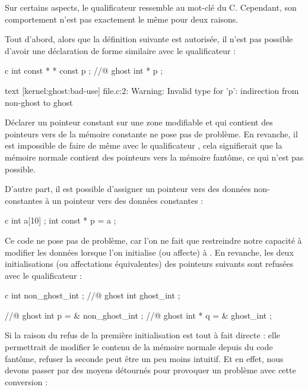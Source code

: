

Sur certains aspects, le qualificateur  ressemble
au mot-clé  du C. Cependant, son comportement n'est pas
exactement le même pour deux raisons.


Tout d'abord, alors que la définition  suivante
est autorisée,  il n'est pas possible d'avoir une déclaration de
forme similaire avec le qualificateur  :


\begin{CodeBlock}{c}
int const * * const p ;
//@ ghost int \ghost * * p ;
\end{CodeBlock}


\begin{CodeBlock}{text}
[kernel:ghost:bad-use] file.c:2: Warning:
  Invalid type for 'p': indirection from non-ghost to ghost
\end{CodeBlock}



Déclarer un pointeur constant sur une zone modifiable et qui contient
des pointeurs vers de la mémoire constante ne pose pas de problème. En revanche,
il est impossible de faire de même avec le qualificateur
, cela signifierait que la mémoire normale
contient des pointeurs vers la mémoire fantôme, ce qui n'est pas possible.


D'autre part, il est possible d'assigner un pointeur
vers des données non-constantes à un pointeur vers des données constantes :


\begin{CodeBlock}{c}
int a[10] ;
int const * p = a ;
\end{CodeBlock}


Ce code ne pose pas de problème, car l'on ne fait que restreindre notre capacité
à modifier les données lorsque l'on initialise (ou affecte)  à
. En revanche, les deux initialisations (ou affectations
équivalentes) des pointeurs suivants sont refusées avec le qualificateur
 :


\begin{CodeBlock}{c}
int non_ghost_int ;
//@ ghost int ghost_int ;

//@ ghost int \ghost * p = & non_ghost_int ;
//@ ghost int * q = & ghost_int ;
\end{CodeBlock}


Si la raison du refus de la première initialisation est tout à fait directe : elle
permettrait de modifier le contenu de la mémoire normale depuis du code fantôme,
refuser la seconde peut être un peu moins intuitif. Et en effet, nous devons passer
par des moyens détournés pour provoquer un problème avec cette conversion :


